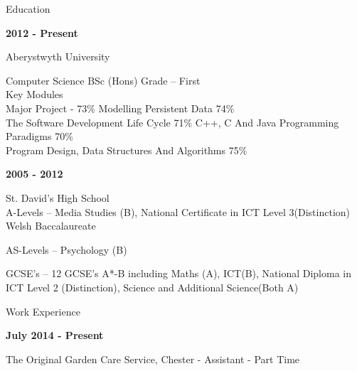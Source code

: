 \documentclass[10pt,a4paper]{article}
\begin{document}
\Large
\noindent
Education\\
\large
\vspace{0.1cm}
\noindent

\textbf{2012 - Present }\\
\normalsize



\begin{center}
Aberystwyth University\\
\vspace{0.1cm}

Computer Science BSc (Hons) Grade – First\\
Key Modules \\
\vspace{0.2cm}
Major Project - 73\% \hspace{3cm} Modelling Persistent Data 74\%\\
\vspace{0.2cm}
The Software Development Life Cycle 71\% \hspace{0.2cm} C++, C And Java Programming Paradigms 70\%\\
\vspace{0.2cm}
Program Design, Data Structures And Algorithms 75\%
\end{center}
\noindent
\large
\newpage
\textbf{2005 - 2012}\\
\normalsize

\begin{center}
St. David's High School\\
\vspace{0.1cm}
A-Levels – Media Studies (B), National Certificate in ICT Level 3(Distinction)\\ Welsh Baccalaureate

AS-Levels – Psychology (B)

GCSE’s – 12 GCSE’s A*-B including Maths (A), ICT(B), National Diploma in ICT Level 2 (Distinction), Science and Additional Science(Both A)\\

\end{center}

\Large	
\noindent
Work Experience\\

\normalsize

\noindent 
\textbf{July 2014 - Present}
\normalsize

\noindent
The Original Garden Care Service, Chester - Assistant - Part Time\\
\end{document}
